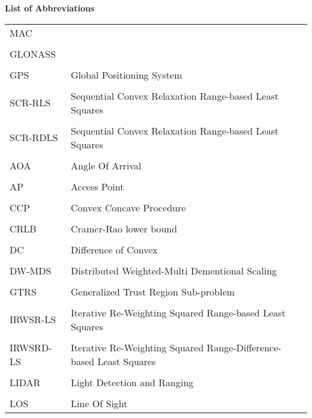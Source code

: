 \newpage


\phantom{m}

\begin{flushleft}
\begin{Huge}
\textbf{List of Abbreviations}
\end{Huge}
\end{flushleft}

\phantom{m}

\begin{longtable}[h]{l l}

MAC & \\
\\
GLONASS & \\
\\
GPS & Global Positioning System \\
\\
SCR-RLS & Sequential Convex Relaxation Range-based Least Squares \\
\\
SCR-RDLS & Sequential Convex Relaxation Range-based Least Squares\\
\\
AOA & Angle Of Arrival\\
\\
AP & Access Point \\
\\
CCP & Convex Concave Procedure \\
\\
CRLB & Cram$\acute{e}$r-Rao  lower  bound \\
\\
DC & Difference of Convex \\
\\
DW-MDS & Distributed Weighted-Multi Dementional Scaling \\
\\
GTRS & Generalized Trust Region Sub-problem \\
\\
IRWSR-LS & Iterative Re-Weighting Squared Range-based Least Squares \\
\\
IRWSRD-LS & Iterative Re-Weighting Squared Range-Difference-based Least Squares\\
\\
LIDAR & Light Detection and Ranging\\
\\
LOS & Line Of Sight \\

\end{longtable}
